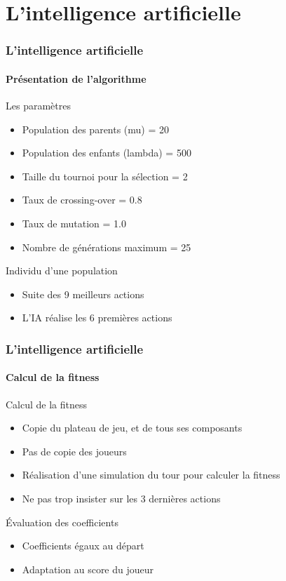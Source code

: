 \section{L'intelligence artificielle}

\begin{frame}
	\frametitle{L'intelligence artificielle}
	\framesubtitle{Présentation de l'algorithme}
	
	\begin{block}{Les paramètres}
		\begin{itemize}
			\item Population des parents (mu) = 20
			\item Population des enfants (lambda) = 500
			\item Taille du tournoi pour la sélection = 2
			\item Taux de crossing-over = 0.8
			\item Taux de mutation = 1.0
			\item Nombre de générations maximum = 25
		\end{itemize}
	\end{block}	
	
	\begin{exampleblock}{Individu d'une population}
		\begin{itemize}
			\item Suite des 9 meilleurs actions
			\item L'IA réalise les 6 premières actions
		\end{itemize}
	\end{exampleblock}	
\end{frame}

\begin{frame}
	\frametitle{L'intelligence artificielle}
	\framesubtitle{Calcul de la fitness}
	
	\begin{block}{Calcul de la fitness}
		\begin{itemize}
			\item Copie du plateau de jeu, et de tous ses composants
			\item Pas de copie des joueurs
			\item Réalisation d'une simulation du tour pour calculer la fitness
			\item Ne pas trop insister sur les 3 dernières actions
		\end{itemize}
	\end{block}

	\begin{block}{Évaluation des coefficients}
		\begin{itemize}
			\item Coefficients égaux au départ
			\item Adaptation au score du joueur
		\end{itemize}
	\end{block}
\end{frame}

